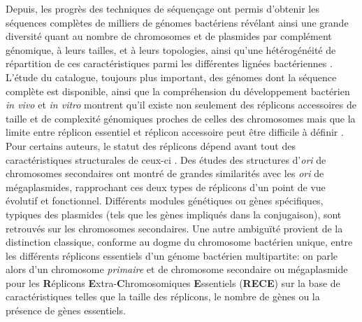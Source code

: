         Depuis, les progrès des techniques de séquençage ont permis d'obtenir les séquences complètes de milliers de génomes bactériens révélant ainsi une grande diversité quant au nombre de chromosomes et de plasmides par complément génomique, à leurs tailles, et à leurs topologies, ainsi qu'une hétérogénéité de répartition de ces caractéristiques parmi les différentes lignées bactériennes \citep{casjens1998diverse,Mackenzie2004}. L'étude du catalogue, toujours plus important, des génomes dont la séquence complète est disponible, ainsi que la compréhension du développement bactérien \textit{in vivo} et \textit{in vitro} montrent qu'il existe non seulement des réplicons accessoires de taille et de complexité génomiques proches de celles des chromosomes mais que la limite entre réplicon essentiel et réplicon accessoire peut être difficile à définir \citep{Mackenzie2004}.\\ 
	Pour certains auteurs, le statut des réplicons dépend avant tout des caractéristiques structurales de ceux-ci  \citep{harrison2011bacterial}. Des études des structures d'\textit{ori} de chromosomes secondaires ont montré de grandes similarités avec les \textit{ori} de mégaplasmides, rapprochant ces deux types de réplicons d'un point de vue évolutif et fonctionnel. Différents modules génétiques ou gènes spécifiques, typiques des plasmides (tels que les gènes impliqués dans la conjugaison), sont retrouvés sur les chromosomes secondaires. Une autre ambiguïté provient de la distinction classique, conforme au dogme du chromosome bactérien unique, entre les différents réplicons essentiels d'un génome bactérien multipartite: on parle alors d'un chromosome \textit{primaire} et de chromosome secondaire ou mégaplasmide \citep{MacLellan2004} pour les \textbf{R}éplicons \textbf{E}xtra-\textbf{C}hromosomiques \textbf{E}ssentiels (\textbf{RECE}) sur la base de caractéristiques telles que la taille des réplicons, le nombre de gènes ou la présence de gènes essentiels.


